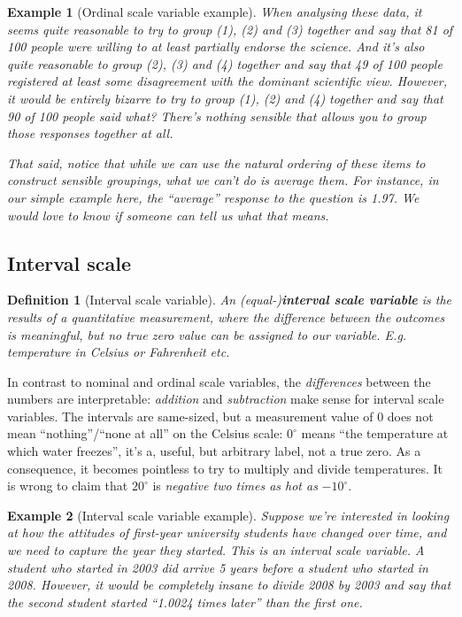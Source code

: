 \documentclass[
  11pt,
]{book}
\theoremstyle{indenteddefinition}
\newtheorem{definition}{Definition}[chapter]
\theoremstyle{indenteddefinition}
\newtheorem{example}{Example}[chapter]
\theoremstyle{definition}
\theoremstyle{definition}
\theoremstyle{remark}
\begin{document}
\begin{example}[Ordinal scale variable example]
When analysing these data, it seems quite reasonable to try to group (1), (2) and (3) together and say that 81 of 100 people were willing to \emph{at least partially} endorse the science. And it's \emph{also} quite reasonable to group (2), (3) and (4) together and say that 49 of 100 people registered \emph{at least some disagreement} with the dominant scientific view. However, it would be entirely bizarre to try to group (1), (2) and (4) together and say that 90 of 100 people said what? There's nothing sensible that allows you to group those responses together at all.

That said, notice that while we \emph{can} use the natural ordering of these items to construct sensible groupings, what we \emph{can't} do is average them. For instance, in our simple example here, the ``average'' response to the question is 1.97. We would love to know if someone can tell us what that means.
\end{example}

\hypertarget{intervalscale}{%
\subsection{Interval scale}\label{intervalscale}}

\begin{definition}[Interval scale variable]
\protect\hypertarget{def:definterval}{}\label{def:definterval}An (equal-)\textbf{interval scale variable} is the results of a \emph{quantitative} measurement, where the difference between the outcomes is meaningful, but \emph{no true zero} value can be assigned to our variable. E.g. temperature in Celsius or Fahrenheit etc.
\end{definition}

In contrast to nominal and ordinal scale variables, the \emph{differences} between the numbers are interpretable: \emph{addition} and \emph{subtraction} make sense for interval scale variables. The intervals are same-sized, but a measurement value of 0 does not mean ``nothing''/``none at all'' on the Celsius scale: \(0^\circ\) means ``the temperature at which water freezes'', it's a, useful, but arbitrary label, not a true zero. As a consequence, it becomes pointless to try to multiply and divide temperatures. It is wrong to claim that \(20^\circ\) is \emph{negative two times as hot as} \(-10^\circ\).

\begin{example}[Interval scale variable example]
\protect\hypertarget{exm:exinterval}{}\label{exm:exinterval}Suppose we're interested in looking at how the attitudes of first-year university students have changed over time, and we need to capture the \emph{year they started}. This is an interval scale variable. A student who started in 2003 did arrive 5 years before a student who started in 2008. However, it would be completely insane to divide 2008 by 2003 and say that the second student started ``1.0024 times later'' than the first one.
\end{example}
\end{document}
